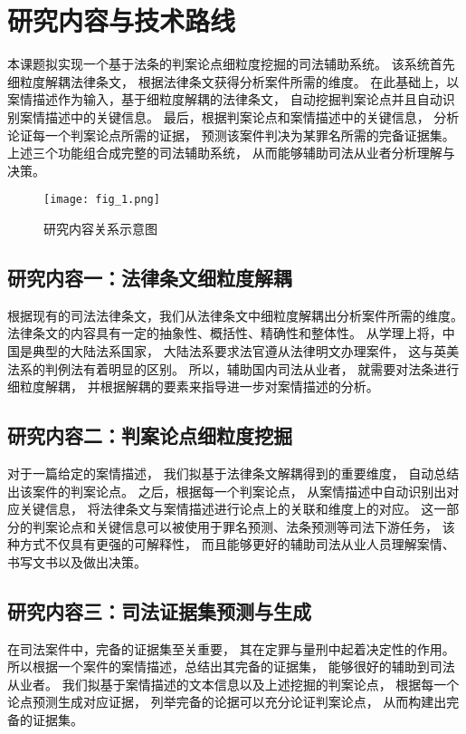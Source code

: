\section{研究内容与技术路线}

本课题拟实现一个基于法条的判案论点细粒度挖掘的司法辅助系统。
该系统首先细粒度解耦法律条文，
根据法律条文获得分析案件所需的维度。
在此基础上，以案情描述作为输入，基于细粒度解耦的法律条文，
自动挖掘判案论点并且自动识别案情描述中的关键信息。
最后，根据判案论点和案情描述中的关键信息，
分析论证每一个判案论点所需的证据，
预测该案件判决为某罪名所需的完备证据集。
上述三个功能组合成完整的司法辅助系统，
从而能够辅助司法从业者分析理解与决策。
\begin{figure}[h]
	\centering
	\texttt{[image: fig\_1.png]}
	\caption{研究内容关系示意图}
	\label{fig_1}
\end{figure}

\subsection{研究内容一：法律条文细粒度解耦}
根据现有的司法法律条文，我们从法律条文中细粒度解耦出分析案件所需的维度。
法律条文的内容具有一定的抽象性、概括性、精确性和整体性。
从学理上将，中国是典型的大陆法系国家，
大陆法系要求法官遵从法律明文办理案件，
这与英美法系的判例法有着明显的区别。
所以，辅助国内司法从业者，
就需要对法条进行细粒度解耦，
并根据解耦的要素来指导进一步对案情描述的分析。

\subsection{研究内容二：判案论点细粒度挖掘}
对于一篇给定的案情描述，
我们拟基于法律条文解耦得到的重要维度，
自动总结出该案件的判案论点。
之后，根据每一个判案论点，
从案情描述中自动识别出对应关键信息，
将法律条文与案情描述进行论点上的关联和维度上的对应。
这一部分的判案论点和关键信息可以被使用于罪名预测、法条预测等司法下游任务，
该种方式不仅具有更强的可解释性，
而且能够更好的辅助司法从业人员理解案情、书写文书以及做出决策。

\subsection{研究内容三：司法证据集预测与生成}
在司法案件中，完备的证据集至关重要，
其在定罪与量刑中起着决定性的作用。
所以根据一个案件的案情描述，总结出其完备的证据集，
能够很好的辅助到司法从业者。
我们拟基于案情描述的文本信息以及上述挖掘的判案论点，
根据每一个论点预测生成对应证据，
列举完备的论据可以充分论证判案论点，
从而构建出完备的证据集。

